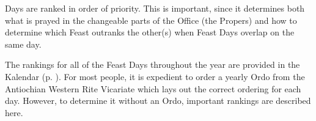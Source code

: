 {}\label{ranking}
\noindent
{} Days are ranked in order of priority. This is important, since it determines both what is prayed in the changeable parts of the Office (the Propers) and how to determine which Feast outranks the other(s) when Feast Days overlap on the same day.\par
The rankings for all of the Feast Days throughout the year are provided in the Kalendar (p. \pageref{kalendar}). For most people, it is expedient to order a yearly Ordo from the Antiochian Western Rite Vicariate which lays out the correct ordering for each day. However, to determine it without an Ordo, important rankings are described here.
